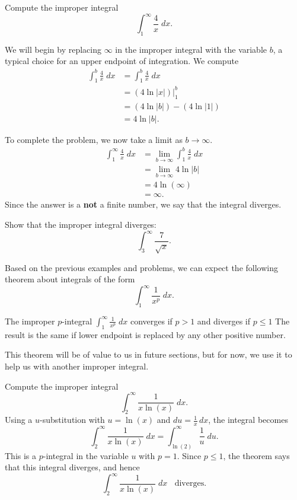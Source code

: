 \documentclass{ximera}
\begin{document}
\begin{example}
Compute the improper integral
\[
\int_1^\infty \frac{4}{x} \; dx.
\]

We will begin by replacing $\infty$ in the improper integral with the variable $b$, a typical choice for an upper endpoint of integration.
We compute
\begin{align*}
\int_1^b \frac{4}{x} \; dx &= \int_1^b \frac{4}{x} \; dx\\
                           &= \left(4\ln|x| \right) \bigg|_1^b\\
                       &= \left(4\ln|b| \right) - \left(4\ln|1| \right)\\
                       &=4\ln|b|.
\end{align*}
                       
To complete the problem, we now take a limit as $b \to \infty$.
\begin{align*}
\int_1^\infty \frac{4}{x} \; dx &= \lim_{b \to \infty}\int_1^b \frac{4}{x} \; dx\\
                       &=\lim_{b \to \infty} 4\ln|b|\\
                       &= 4\ln(\infty)\\
                       &= \infty.
\end{align*}
Since the answer is a \textbf{not} a finite number, we say that the integral diverges.

\end{example}


\begin{problem}
Show that the improper integral diverges:
\[
\int_3^\infty \frac{7}{\sqrt x}.
\]
\end{problem}

Based on the previous examples and problems, we can expect the following theorem about integrals of the form
\[
\int_1^\infty \frac{1}{x^p} \; dx.
\]

\begin{theorem}[$p$-integrals]
The improper $p$-integral $\int_1^\infty \frac{1}{x^p} \; dx$
 converges if $p>1$ and diverges if $p \leq 1$
The result is the same if lower endpoint is replaced by any other positive number.
\end{theorem}
This theorem will be of value to us in future sections, but for now, we use it to help us with another improper integral.


\begin{example}
Compute the improper integral
\[
\int_2^\infty \frac{1}{x\ln(x)} \; dx.
\]
Using a $u$-substitution with $u = \ln(x)$ and $du = \frac{1}{x} \, dx$, the integral becomes
\[
\int_2^\infty \frac{1}{x\ln(x)} \; dx = \int_{\ln(2)}^\infty \frac{1}{u} \; du.
\]
This is a $p$-integral in the variable $u$ with $p=1$. Since $p \leq 1$, the theorem says that this integral diverges, and hence
\[
\int_2^\infty \frac{1}{x\ln(x)} \; dx \;\; \text{ diverges}.
\]
\end{example}
\end{document}
